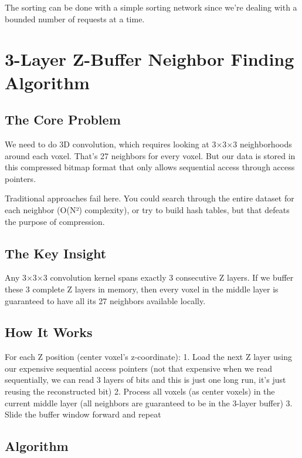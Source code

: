 \documentclass[12pt]{article}
\begin{document}
The sorting can be done with a simple sorting network since we're dealing with a bounded number of requests at a time.

\section{3-Layer Z-Buffer Neighbor Finding Algorithm}

\subsection{The Core Problem}

We need to do 3D convolution, which requires looking at 3×3×3 neighborhoods around each voxel. That's 27 neighbors for every voxel. But our data is stored in this compressed bitmap format that only allows sequential access through access pointers.

Traditional approaches fail here. You could search through the entire dataset for each neighbor (O(N²) complexity), or try to build hash tables, but that defeats the purpose of compression.

\subsection{The Key Insight}

Any 3×3×3 convolution kernel spans exactly 3 consecutive Z layers. If we buffer these 3 complete Z layers in memory, then every voxel in the middle layer is guaranteed to have all its 27 neighbors available locally.

\subsection{How It Works}

For each Z position (center voxel's z-coordinate):
1. Load the next Z layer using our expensive sequential access pointers (not that expensive when we read sequentially, we can read 3 layers of bits and this is just one long run, it's just reusing the reconstructed bit)
2. Process all voxels (as center voxels) in the current middle layer (all neighbors are guaranteed to be in the 3-layer buffer)
3. Slide the buffer window forward and repeat

\subsection{Algorithm}
\end{document}
